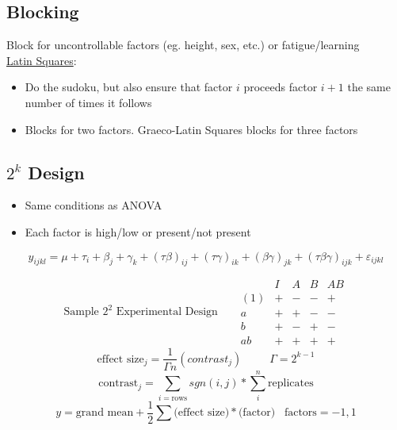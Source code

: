 \documentclass[twocolumn, 12pt]{article}    %
\begin{document}
\subsection*{Blocking}
Block for uncontrollable factors (eg. height, sex, etc.) or fatigue/learning\\
\underline{Latin Squares}:
\begin{itemize}
    \item Do the sudoku, but also ensure that factor \(i\) proceeds factor \(i+1\) the same number of times it follows
    \item Blocks for two factors. Graeco-Latin Squares blocks for three factors
\end{itemize}



\subsection*{\(2^k\) Design}
\begin{itemize}
    \item Same conditions as ANOVA
    \item Each factor is high/low or present/not present
\end{itemize}
\begin{equation*}
    y_{ijkl} = \mu + \tau_i + \beta_j + \gamma_k + (\tau\beta)_{ij} + (\tau\gamma)_{ik} + (\beta\gamma)_{jk} + (\tau\beta\gamma)_{ijk} +\varepsilon_{ijkl}
\end{equation*}

\[\text{Sample } 2^2 \text{ Experimental Design} \hspace{20pt}
\begin{matrix}
        & I & A & B & AB\\
    (1) & + & - & - & +\\
    a   & + & + & - & -\\
    b   & + & - & + & -\\
    ab  & + & + & + & +
\end{matrix}\]
\begin{equation*}
    \text{effect size}_j = \frac{1}{\Gamma n }(contrast_j)  \hspace{30pt} \Gamma= 2^{k-1}
\end{equation*}
\begin{equation*}
        \text{contrast}_j = \sum_{i=\text{rows}} sgn(i,j) * \sum_i^n \text{replicates}
\end{equation*}
\begin{equation*}
    y = \text{grand mean} + \frac{1}{2} \sum \text{(effect size)}*\text{(factor)} \hspace{10pt} \text{factors} = -1,1
\end{equation*}
\end{document}
